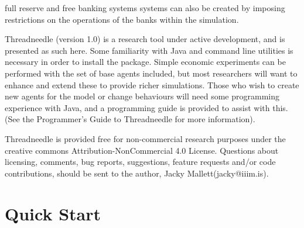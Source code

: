 \documentclass[10pt,oneside,openright, a4paper]{memoir}
\begin{document}
full reserve and free banking systems systems can 
also be created by imposing restrictions on the operations of the banks
within the simulation. 
\par
Threadneedle (version 1.0) is a research tool under active development, and 
is presented as such here. Some familiarity with Java and command line 
utilities is necessary in order  to install the package. Simple economic 
experiments can be performed with the set of base agents included, but most 
researchers will want
to enhance and extend these to provide richer simulations.
Those who wish to create new agents for the model or change behaviours will
need some programming experience with Java, and a programming guide is provided
to assist with this. (See the Programmer's Guide to Threadneedle for more information).
\par
Threadneedle is provided free for non-commercial research purposes under the creative commons Attribution-NonCommercial 4.0 License. Questions about licensing, 
comments, bug reports, suggestions, feature requests and/or code contributions,
should be sent to the author, Jacky Mallett(jacky@iiim.is). 
\chapter{Quick Start}
\end{document}
